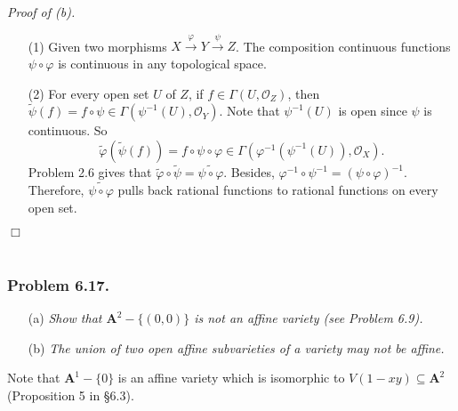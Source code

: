 \documentclass{article}
\begin{document}
\emph{Proof of (b).}
\begin{enumerate}
\item[(1)]
  Given two morphisms $X \xrightarrow{\varphi} Y \xrightarrow{\psi} Z$.
  The composition continuous functions $\psi \circ \varphi$ is continuous
  in any topological space.

\item[(2)]
  For every open set $U$ of $Z$,
  if $f \in \Gamma(U, \mathscr{O}_Z)$,
  then $\widetilde{\psi}(f) = f \circ \psi \in \Gamma(\psi^{-1}(U), \mathscr{O}_Y)$.
  Note that $\psi^{-1}(U)$ is open since $\psi$ is continuous.
  So
  \[
    \widetilde{\varphi}(\widetilde{\psi}(f))
    = f \circ \psi \circ \varphi
    \in \Gamma(\varphi^{-1}(\psi^{-1}(U)), \mathscr{O}_X).
  \]
  Problem 2.6 gives that
  $\widetilde{\varphi} \circ \widetilde{\psi} = \widetilde{\psi \circ \varphi}$.
  Besides, $\varphi^{-1} \circ \psi^{-1} = (\psi \circ \varphi)^{-1}$.
  Therefore, $\widetilde{\psi \circ \varphi}$ pulls back rational functions
  to rational functions on every open set.
\end{enumerate}
$\Box$ \\\\








\subsubsection*{Problem 6.17.}
\begin{enumerate}
\item[(a)]
  \emph{Show that $\mathbf{A}^{2} - \{(0,0)\}$ is not an affine variety (see Problem 6.9).}

\item[(b)]
  \emph{The union of two open affine subvarieties of a variety may not be affine.} \\
\end{enumerate}

Note that $\mathbf{A}^{1} - \{0\}$ is an affine variety which is isomorphic to
$V(1-xy) \subseteq \mathbf{A}^2$ (Proposition 5 in \S 6.3). \\
\end{document}
